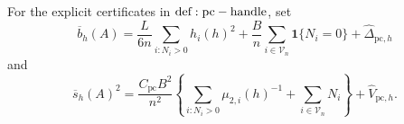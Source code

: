 For the explicit certificates in \({\rm def:pc-handle}\), set
\[
 \overline b_h(A)=\frac{L}{6n}\sum_{i:N_i>0}h_i(h)^2
 +\frac{B}{n}\sum_{i\in\mathcal V_n}\mathbf1\{N_i=0\}
 +\widehat\Delta_{\mathrm{pc},h}
\]
and
\[
 \overline s_h(A)^2
 =\frac{C_{\mathrm{pc}}B^2}{n^2}
 \left\{\sum_{i:N_i>0}\mu_{2,i}(h)^{-1}
       +\sum_{i\in\mathcal V_n}N_i\right\}
 +\widehat V_{\mathrm{pc},h}.
\]